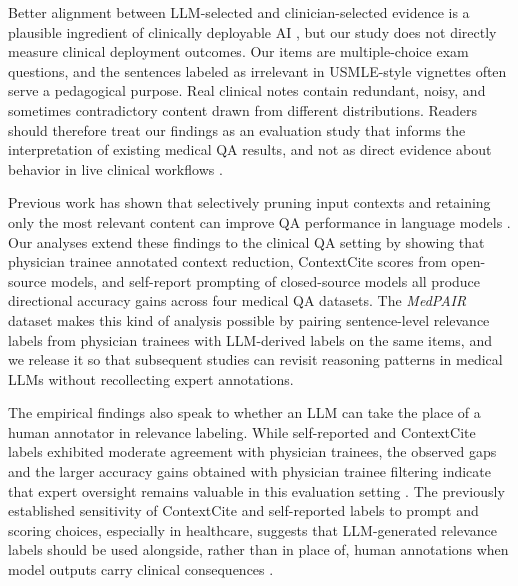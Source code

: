 \documentclass[fleqn,10pt]{wlscirep}
\begin{document}
Better alignment between LLM-selected and clinician-selected evidence is a plausible ingredient of clinically deployable AI \cite{gourabathina2025medperturb}, but our study does not directly measure clinical deployment outcomes. Our items are multiple-choice exam questions, and the sentences labeled as irrelevant in USMLE-style vignettes often serve a pedagogical purpose. Real clinical notes contain redundant, noisy, and sometimes contradictory content drawn from different distributions. Readers should therefore treat our findings as an evaluation study that informs the interpretation of existing medical QA results, and not as direct evidence about behavior in live clinical workflows \cite{yang_harnessing_2023}.

Previous work has shown that selectively pruning input contexts and retaining only the most relevant content can improve QA performance in language models \cite{mckechnie_context_2025, kabongo_effective_2024}. Our analyses extend these findings to the clinical QA setting by showing that physician trainee annotated context reduction, ContextCite scores from open-source models, and self-report prompting of closed-source models all produce directional accuracy gains across four medical QA datasets. The \emph{MedPAIR} dataset makes this kind of analysis possible by pairing sentence-level relevance labels from physician trainees with LLM-derived labels on the same items, and we release it so that subsequent studies can revisit reasoning patterns in medical LLMs without recollecting expert annotations.

The empirical findings also speak to whether an LLM can take the place of a human annotator in relevance labeling. While self-reported and ContextCite labels exhibited moderate agreement with physician trainees, the observed gaps and the larger accuracy gains obtained with physician trainee filtering indicate that expert oversight remains valuable in this evaluation setting \cite{shi_judging_2025, zheng_judging_2023, soboroff_dont_2025, qiu2025quantifying}. The previously established sensitivity of ContextCite and self-reported labels to prompt and scoring choices, especially in healthcare, suggests that LLM-generated relevance labels should be used alongside, rather than in place of, human annotations when model outputs carry clinical consequences \cite{li2025medguide, abbasiantaeb_can_2024}.

\end{document}
